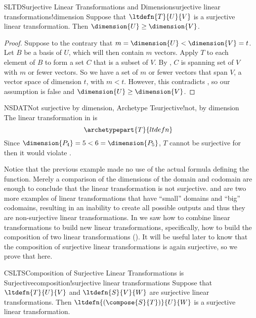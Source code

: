 %
%
\begin{theorem}{SLTD}{Surjective Linear Transformations and Dimension}{surjective linear transformations!dimension}
Suppose that $\ltdefn{T}{U}{V}$ is a surjective linear transformation.  Then $\dimension{U}\geq\dimension{V}$.
\end{theorem}
%
\begin{proof}
%
Suppose to the contrary that $m=\dimension{U}<\dimension{V}=t$.  Let $B$ be  a basis of $U$, which will then contain $m$ vectors.  Apply $T$ to each element of $B$ to form a set $C$ that is a subset of $V$.  By , $C$ is spanning set of $V$ with $m$ or fewer vectors.  So we have a set of $m$ or fewer vectors that span $V$, a vector space of dimension $t$, with $m<t$.  However, this contradicts , so our assumption is false and $\dimension{U}\geq\dimension{V}$.
%
\end{proof}
%
%
\begin{example}{NSDAT}{Not surjective by dimension, Archetype T}{surjective!not, by dimension}
The linear transformation in  is 
%
\begin{equation*}
\archetypepart{T}{ltdefn}
\end{equation*}
%
Since $\dimension{P_4}=5<6=\dimension{P_5}$, $T$ cannot be surjective for then it would violate .
%
\end{example}
%
Notice that the previous example made no use of the actual formula defining the function.  Merely a comparison of the dimensions of the domain and codomain are enough to conclude that the linear transformation is not surjective.   and  are two more examples of linear transformations that have ``small'' domains and ``big'' codomains, resulting in an inability to create all possible outputs and thus they are non-surjective linear transformations.
%
%
In  we saw how to combine linear transformations to build new linear transformations, specifically, how to build the composition of two linear transformations ().  It will be useful later to know that the composition of surjective linear transformations is again surjective, so we prove that here.
%
\begin{theorem}{CSLTS}{Composition of Surjective Linear Transformations is Surjective}{composition!surjective linear transformations}
Suppose that $\ltdefn{T}{U}{V}$ and $\ltdefn{S}{V}{W}$ are surjective linear transformations.  Then $\ltdefn{(\compose{S}{T})}{U}{W}$ is a surjective linear transformation.
\end{theorem}
